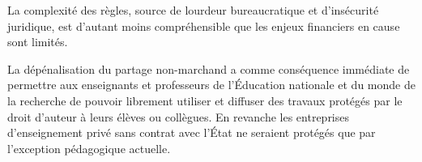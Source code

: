 La complexité des règles, source de lourdeur bureaucratique et d’insécurité juridique, est d’autant moins compréhensible que les enjeux financiers en cause sont limités.

La dépénalisation du partage non-marchand a comme conséquence immédiate de permettre aux enseignants et professeurs de l'Éducation nationale et du monde de la recherche de pouvoir librement utiliser et diffuser des travaux protégés par le droit d'auteur à leurs élèves ou collègues. En revanche les entreprises d'enseignement privé sans contrat avec l'État ne seraient protégés que par l'exception pédagogique actuelle.

